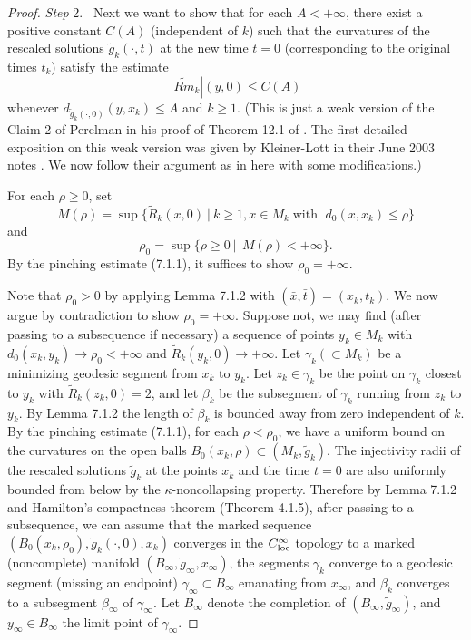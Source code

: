 \begin{proof}

\smallskip
{\it Step} 2. \  Next we want to show that for each $A<+\infty$,
there exist a positive constant $C(A)$ (independent of $k$) such
that the curvatures of the rescaled solutions
$\tilde{g}_k(\cdot,t)$ at the new time $t =0$ (corresponding to
the original times $t_k$) satisfy the estimate
$$
|\widetilde{Rm}_{k}|(y,0) \leq C(A)
$$
whenever $d_{\tilde{g}_k(\cdot,0)}(y,x_k) \leq A$ and $k \geq 1$.
(This is just a weak version of the Claim 2 of Perelman in his
proof of Theorem 12.1 of \cite{P1}. The first detailed exposition
on this weak version was given by Kleiner-Lott in their June 2003
notes \cite{KL}. We now follow their argument as in \cite{KL} here
with some modifications.)

For each $\rho \geq 0$, set
$$
M(\rho)=\sup\{\tilde{R}_k(x,0)\ |\ k\geq 1, x\in M_k \; \mbox{
with } \;d_{0}(x,x_k)\leq \rho\}
$$
and
$$
\rho_0=\sup\{\rho \geq 0\  |\ \ M(\rho)<+\infty \}.
$$
By the pinching estimate (7.1.1), it suffices to show
$\rho_0=+\infty.$

Note that $\rho_0>0$ by applying Lemma 7.1.2 with
$(\bar{x},\bar{t})=(x_k,t_k).$ We now argue by contradiction to
show $\rho_0=+\infty.$ Suppose not, we may find (after passing to
a subsequence if necessary) a sequence of points $y_k\in M_k$ with
$d_{0}(x_k,y_k)\rightarrow \rho_0<+\infty$ and
$\tilde{R}_k(y_k,0)\rightarrow +\infty$. Let $\gamma_k(\subset
M_k)$ be a minimizing geodesic segment from $x_k$ to $y_k$. Let
$z_k\in \gamma_k$ be the point on $\gamma_k$ closest to $y_k$ with
$\tilde{R}_k(z_k,0)=2$, and let $\beta_k$ be the subsegment of
$\gamma_k$ running from $z_k$ to $y_k$. By Lemma 7.1.2 the length
of $\beta_k$ is bounded away from zero independent of $k$. By the
pinching estimate (7.1.1), for each $\rho<\rho_0$, we have a
uniform bound on the curvatures on the open balls
$B_{0}(x_k,\rho)\subset (M_k,\tilde{g}_k)$. The injectivity radii
of the rescaled solutions $\tilde{g}_k$ at the points $x_k$ and
the time $t=0$ are also uniformly bounded from below by the
$\kappa$-noncollapsing property. Therefore by Lemma 7.1.2 and
Hamilton's compactness theorem (Theorem 4.1.5), after passing to a
subsequence, we can assume that the marked sequence
$(B_{0}(x_k,\rho_0),\tilde{g}_k(\cdot,0),x_k)$ converges in the
$C_{\rm loc}^{\infty}$ topology to a marked (noncomplete) manifold
$(B_{\infty},\tilde{g}_{\infty},x_{\infty})$, the segments
$\gamma_k$ converge to a geodesic segment (missing an endpoint)
$\gamma_{\infty}\subset B_{\infty}$ emanating from $x_{\infty}$,
and $\beta_k$ converges to a subsegment $\beta_{\infty}$ of
$\gamma_{\infty}$. Let $\bar{B}_{\infty}$ denote the completion of
$(B_{\infty},\tilde{g}_{\infty})$, and $y_{\infty}\in
\bar{B}_{\infty}$ the limit point of $\gamma_{\infty}$.


\end{proof}
